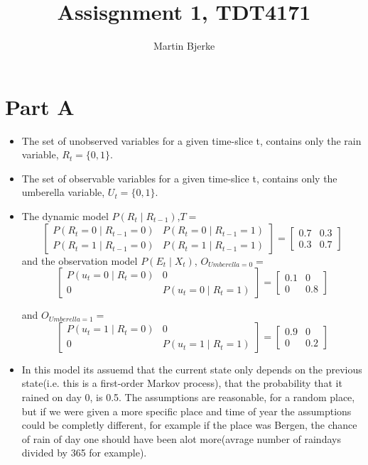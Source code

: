 \documentclass[12pt, letterpaper]{article}
\title{Assisgnment 1, TDT4171}
\author{Martin Bjerke}
\begin{document}
\maketitle


\section{Part A}

\begin{itemize}
\item The set of unobserved variables for a given time-slice t, contains only
  the rain variable, $R_t = \{0,1\} $.
\item The set of observable variables for a given time-slice t, contains only
  the umberella variable, $U_t = \{0,1\} $.
\item The dynamic model $P(R_t \mid R_{t-1})$,$T = $
  \[\begin{bmatrix}
      P(R_t=0 \mid R_{t-1}=0) & P(R_t=0 \mid R_{t-1}=1) \\
      P(R_t=1 \mid R_{t-1}=0) & P(R_t=1 \mid R_{t-1}=1)
    \end{bmatrix}
    =
    \begin{bmatrix}
      0.7 & 0.3 \\
      0.3 & 0.7
    \end{bmatrix}\]
  and the observation model $P(E_t \mid X_t)$,
  $ O_{Umberella = 0} = $
  \[\begin{bmatrix}
      P(u_t=0 \mid R_t=0) & 0 \\
      0 & P(u_t=0 \mid R_{t}=1)
    \end{bmatrix}
    =
    \begin{bmatrix}
      0.1 & 0 \\
      0 & 0.8
    \end{bmatrix}\]

    and $O_{Umberella = 1} = $
    \[\begin{bmatrix}
      P(u_t=1 \mid R_t=0) & 0 \\
      0 & P(u_t=1 \mid R_{t}=1)
    \end{bmatrix}
    =
    \begin{bmatrix}
      0.9 & 0 \\
      0 & 0.2
    \end{bmatrix}\]

\item In this model its assuemd that the current state only depends on the
  previous state(i.e. this is a first-order Markov process), that the probability
  that it rained on day 0, is 0.5. The assumptions are reasonable, for a random
  place, but if we were given a more specific place and time of year the
  assumptions could be completly different, for example if the place was Bergen,
  the chance of rain of day one should have been alot more(avrage number of
  raindays divided by 365 for example).
\end{itemize}
\end{document}

